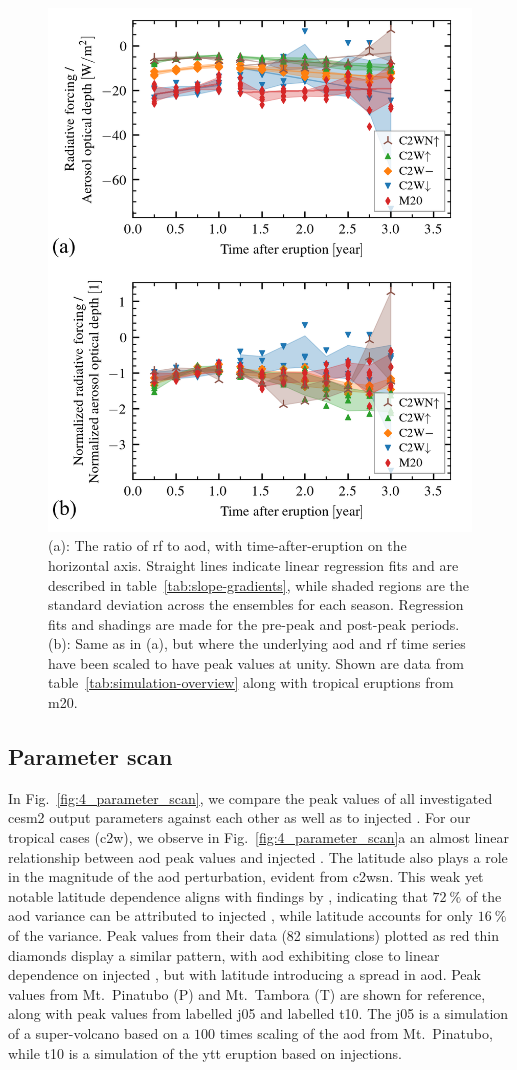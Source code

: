 \documentclass{ametsocV6.1}
\newcommand{\iso}[1][i]{{#1}njected \ce{SO2}}
\begin{document}
\begin{figure}
  \centering
  \includegraphics[width=0.5\linewidth]{figures/figure3.png}

  \caption{(a): The ratio of \gls{rf} to \gls{aod}, with time-after-eruption on the
    horizontal axis. Straight lines indicate linear regression fits and are described in
    table~\ref{tab:slope-gradients}, while shaded regions are the standard deviation across
    the ensembles for each season. Regression fits and shadings are made for the pre-peak
    and post-peak periods. (b): Same as in (a), but where the underlying \gls{aod} and
    \gls{rf} time series have been scaled to have peak values at unity. Shown are data from
    table~\ref{tab:simulation-overview} along with tropical eruptions from
    \gls{m20}.}\label{fig:3_rf_to_aod_ratios}%
\end{figure}

\subsection{Parameter scan}

In Fig.~\ref{fig:4_parameter_scan}, we compare the peak values of all investigated
\gls{cesm2} output parameters against each other as well as to \iso{}. For our tropical
cases (\gls{c2w}), we observe in Fig.~\ref{fig:4_parameter_scan}a an almost linear
relationship between \gls{aod} peak values and \iso{}. The latitude also plays a role in
the magnitude of the \gls{aod} perturbation, evident from \gls{c2wsn}. This weak yet
notable latitude dependence aligns with findings by \citet{marshall2019}, indicating
that \(\SI{72}{\percent}\) of the \gls{aod} variance can be attributed to \iso{}, while
latitude accounts for only \(\SI{16}{\percent}\) of the variance. Peak values from their
data (82 simulations) plotted as red thin diamonds display a similar pattern, with
\gls{aod} exhibiting close to linear dependence on \iso{}, but with latitude introducing
a spread in \gls{aod}. Peak values from Mt.\ Pinatubo (P) and Mt.\ Tambora (T) are shown
for reference, along with peak values from \citet{jones2005} labelled \gls{j05} and
\citet{timmreck2010} labelled \gls{t10}. The \gls{j05} is a simulation of a
super-volcano based on a \(100\) times scaling of the \gls{aod} from Mt.\ Pinatubo,
while \gls{t10} is a simulation of the \gls{ytt} eruption based on  injections.
\end{document}
